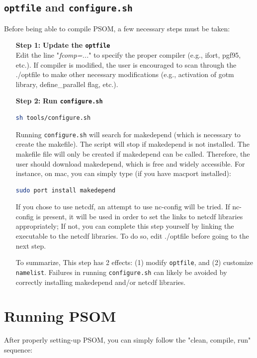 \documentclass[12pt,letterpaper,titlepage]{article}
\begin{document}
\subsection{\texttt{optfile} and \texttt{configure.sh}}

Before being able to compile PSOM, a few necessary steps must be taken:

\begin{itemize}
	\item[\textbf{Step 1:}] \textbf{Update the \texttt{optfile}}\\
	Edit the line "\textit{fcomp=...}" to specify the proper compiler (e.g., ifort, pgf95, etc.). If compiler is modified, the user is encouraged to scan through the ./optfile to make other necessary modifications (e.g., activation of gotm library, define\_parallel flag, etc.).
	
	\item[\textbf{Step 2:}] \textbf{Run \texttt{configure.sh}}
\begin{lstlisting}[language=sh, breaklines]
		sh tools/configure.sh
\end{lstlisting}
Running \texttt{configure.sh} will search for makedepend (which is necessary to create the makefile). The script will stop if makedepend is not installed. The makefile file will only be created if makedepend can be called. Therefore, the user should download makedepend, which is free and widely accessible. For instance, on mac, you can simply type (if you have macport installed):
\begin{lstlisting}[language=sh, breaklines]
 sudo port install makedepend
\end{lstlisting}
If you chose to use netcdf, an attempt to use nc-config will be tried. If nc-config is present, it will be used in order to set the links to netcdf libraries appropriately; If not, you can complete this step yourself by linking the executable to the netcdf libraries. To do so, edit ./optfile before going to the next step.

To summarize, This step has 2 effects: (1) modify \texttt{optfile}, and (2) customize \texttt{namelist}. Failures in running \texttt{configure.sh} can likely be avoided by correctly installing makedepend and/or netcdf libraries.

\end{itemize}

\section{Running PSOM}
\label{sec: cleanconmpilerun}
After properly setting-up PSOM, you can simply follow the "clean, compile, run" sequence:
\end{document}
